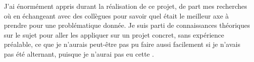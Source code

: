 J'ai énormément appris durant la réalisation de ce projet, de part mes recherches où en échangeant avec des collègues pour savoir quel était le meilleur axe à prendre pour une problématique donnée. Je suis parti de connaissances théoriques sur le sujet pour aller les appliquer sur un projet concret, sans expérience préalable, ce que je n'aurais peut-être pas pu faire aussi facilement si je n'avais pas été alternant, puisque je n'aurai pas eu cette .


